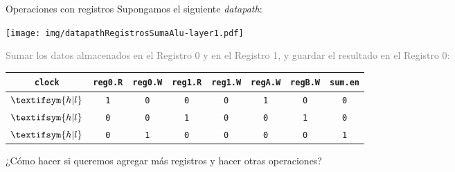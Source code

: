 \documentclass[aspectratio=169]{beamer}
\begin{document}
\begin{frame}[fragile,t]{Operaciones con registros}
    \footnotesize Supongamos el siguiente \emph{datapath}:
    \vspace{-0.05cm}
    \begin{center}
    \texttt{[image: img/datapathRegistrosSumaAlu-layer1.pdf]}
    \end{center}
    \vspace{-0.5cm}
    \textcolor{gray}{\small {Sumar los datos almacenados en el Registro 0 y en el Registro 1, y guardar el resultado en el Registro 0:}}\\
    \begin{center} \footnotesize
    \begin{tabular}{|c|c|c|c|c|c|c|c|} \hline
     \texttt{clock}             & \texttt{reg0.R} & \texttt{reg0.W} & \texttt{reg1.R} & \texttt{reg1.W}  & \texttt{regA.W} & \texttt{regB.W} & \texttt{sum.en} \\ \hline \noalign{\pause}
     {\tiny $\textifsym{h|l}$}  & \texttt{1}      & \texttt{0}      & \texttt{0}      & \texttt{0}      & \texttt{1}       & \texttt{0}      & \texttt{0}      \\ \hline \noalign{\pause}
     {\tiny $\textifsym{h|l}$}  & \texttt{0}      & \texttt{0}      & \texttt{1}      & \texttt{0}      & \texttt{0}       & \texttt{1}      & \texttt{0}      \\ \hline \noalign{\pause} 
     {\tiny $\textifsym{h|l}$}  & \texttt{0}      & \texttt{1}      & \texttt{0}      & \texttt{0}      & \texttt{0}       & \texttt{0}      & \texttt{1}      \\ \hline
    \end{tabular}
    \end{center}
    \begin{center}
    \normalsize \textcolor{naranjauca}{¿Cómo hacer si queremos agregar más registros y hacer otras operaciones?}
    \end{center}
\end{frame}
\end{document}
